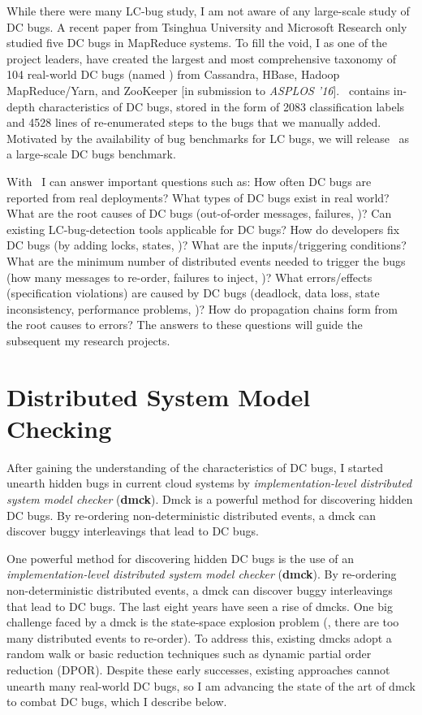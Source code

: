 \documentclass[11pt]{article}
\begin{document}
While there were many LC-bug study, I am not aware of any large-scale study of
DC bugs. A recent paper from Tsinghua University and Microsoft Research only
studied five DC bugs in MapReduce systems. To fill the void, I as one of the
project leaders, have created the largest and most comprehensive taxonomy of 104
real-world DC bugs (named \taxdc) from Cassandra, HBase, Hadoop MapReduce/Yarn,
and ZooKeeper [in submission to \textit{ASPLOS '16}]. \taxdc\ contains in-depth
characteristics of DC bugs, stored in the form of 2083 classification labels and
4528 lines of re-enumerated steps to the bugs that we manually added. Motivated
by the availability of bug benchmarks for LC bugs, we will release \taxdc\ as a
large-scale DC bugs benchmark.

With \taxdc\, I can answer important questions such as: How often DC bugs are
reported from real deployments? What types of DC bugs exist in real world?  What
are the root causes of DC bugs (out-of-order messages, failures, \etc)? Can
existing LC-bug-detection tools applicable for DC bugs? How do developers fix DC
bugs (by adding locks, states, \etc)? What are the inputs/triggering conditions?
What are the minimum number of distributed events needed to trigger the bugs
(how many messages to re-order, failures to inject, \etc)? What errors/effects
(specification violations) are caused by DC bugs (deadlock, data loss, state
inconsistency, performance problems, \etc)? How do propagation chains form from
the root causes to errors? The answers to these questions will guide the
subsequent my research projects.

\section{Distributed System Model Checking}

After gaining the understanding of the characteristics of DC bugs, I started
unearth hidden bugs in current cloud systems by \textit{implementation-level
distributed system model checker} (\textbf{dmck}). Dmck is a powerful method for
discovering hidden DC bugs. By re-ordering non-deterministic distributed events,
a dmck can discover buggy interleavings that lead to DC bugs.
\fi

One powerful method for discovering hidden DC bugs is the use of an
\textit{implementation-level distributed system model checker} (\textbf{dmck}).
By re-ordering non-deterministic distributed events, a dmck can discover buggy
interleavings that lead to DC bugs. The last eight years have seen a rise of
dmcks. One big challenge faced by a dmck is the state-space explosion problem
(\ie, there are too many distributed events to re-order). To address this,
existing dmcks adopt a random walk or basic reduction techniques such as dynamic
partial order reduction (DPOR). Despite these early successes, existing
approaches cannot unearth many real-world DC bugs, so I am advancing the state
of the art of dmck to combat DC bugs, which I describe below.
\end{document}

